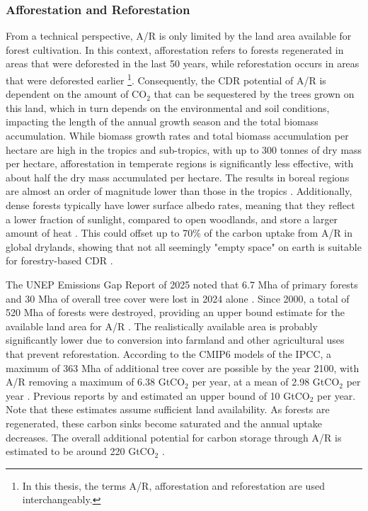\subsubsection{Afforestation and Reforestation}
From a technical perspective, A/R is only limited by the land area available for forest cultivation. In this context, afforestation refers to forests regenerated in areas that were deforested in the last 50 years, while reforestation occurs in areas that were deforested earlier \parencite{unfccc_procedures_2006}\footnote{In this thesis, the terms A/R, afforestation and reforestation are used interchangeably.}. Consequently, the CDR potential of A/R is dependent on the amount of CO$_2$ that can be sequestered by the trees grown on this land, which in turn depends on the environmental and soil conditions, impacting the length of the annual growth season and the total biomass accumulation. While biomass growth rates and total biomass accumulation per hectare are high in the tropics and sub-tropics, with up to 300 tonnes of dry mass per hectare, afforestation in temperate regions is significantly less effective, with about half the dry mass accumulated per hectare. The results in boreal regions are almost an order of magnitude lower than those in the tropics \parencite[4.69]{eggleston_2006_2006}. Additionally, dense forests typically have lower surface albedo rates, meaning that they reflect a lower fraction of sunlight, compared to open woodlands, and store a larger amount of heat \parencite{bernier_boreal_2011}. This could offset up to 70\% of the carbon uptake from A/R in global drylands, showing that not all seemingly "empty space" on earth is suitable for forestry-based CDR \parencite{rohatyn_limited_2022}. \vspace{2mm}

The UNEP Emissions Gap Report of 2025 noted that 6.7 Mha of primary forests and 30 Mha of overall tree cover were lost in 2024 alone \parencite{unep_emissions_2025}. Since 2000, a total of 520 Mha of forests were destroyed, providing an upper bound estimate for the available land area for A/R \parencite{world_resource_institute_forest_2025, sims_global_2025}. The realistically available area is probably significantly lower due to conversion into farmland and other agricultural uses that prevent reforestation. According to the CMIP6 models of the IPCC, a maximum of 363 Mha of additional tree cover are possible by the year 2100, with A/R removing a maximum of 6.38 GtCO$_2$ per year, at a mean of 2.98 GtCO$_2$ per year \parencite{egerer_forestation_2025}. Previous reports by \textcite{fuss_negative_2018} and \textcite{griscom_natural_2017} estimated an upper bound of 10 GtCO$_2$ per year. Note that these estimates assume sufficient land availability. As forests are regenerated, these carbon sinks become saturated and the annual uptake decreases. The overall additional potential for carbon storage through A/R is estimated to be around 220 GtCO$_2$ \parencite{walker_global_2022}.


